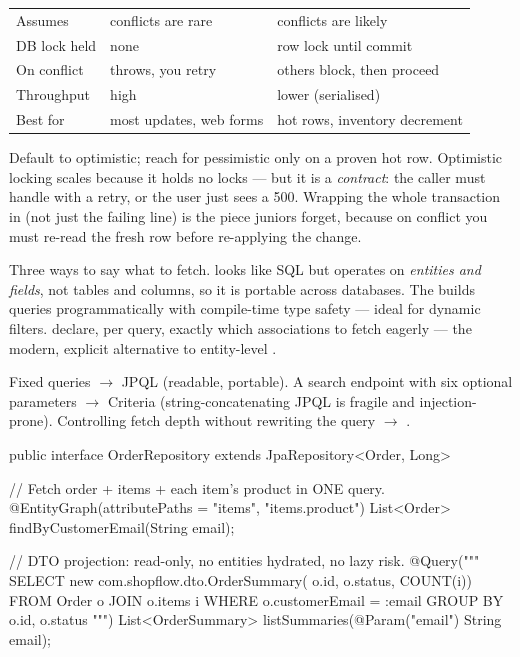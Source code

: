 \begin{center}\small
\begin{tabularx}{\linewidth}{@{}L{26mm} X X@{}}
 &  & \\\midrule
Assumes & conflicts are rare & conflicts are likely\\
DB lock held & none & row lock until commit\\
On conflict & throws, you retry & others block, then proceed\\
Throughput & high & lower (serialised)\\
Best for & most updates, web forms & hot rows, inventory decrement\\
\end{tabularx}
\end{center}

\begin{seniornote}
Default to optimistic; reach for pessimistic only on a proven hot row. Optimistic locking scales because it holds no locks --- but it is a \emph{contract}: the caller must handle  with a retry, or the user just sees a 500. Wrapping the whole transaction in  (not just the failing line) is the piece juniors forget, because on conflict you must re-read the fresh row before re-applying the change.
\end{seniornote}


 Three ways to say what to fetch.  looks like SQL but operates on \emph{entities and fields}, not tables and columns, so it is portable across databases. The  builds queries programmatically with compile-time type safety --- ideal for dynamic filters.  declare, per query, exactly which associations to fetch eagerly --- the modern, explicit alternative to entity-level .

 Fixed queries $\rightarrow$ JPQL (readable, portable). A search endpoint with six optional parameters $\rightarrow$ Criteria (string-concatenating JPQL is fragile and injection-prone). Controlling fetch depth without rewriting the query $\rightarrow$ .

\begin{javabox}
public interface OrderRepository extends JpaRepository<Order, Long> {

  // Fetch order + items + each item's product in ONE query.
  @EntityGraph(attributePaths = {"items", "items.product"})
  List<Order> findByCustomerEmail(String email);

  // DTO projection: read-only, no entities hydrated, no lazy risk.
  @Query("""
      SELECT new com.shopflow.dto.OrderSummary(
               o.id, o.status, COUNT(i))
      FROM Order o JOIN o.items i
      WHERE o.customerEmail = :email
      GROUP BY o.id, o.status
      """)
  List<OrderSummary> listSummaries(@Param("email") String email);
}
\end{javabox}

